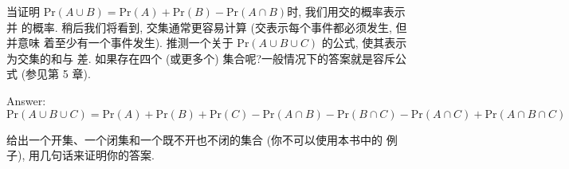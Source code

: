 \exer 当证明 $\mathrm{Pr}(A\cup B) = \mathrm{Pr}(A) + \mathrm{Pr}(B) - \mathrm{Pr}(A \cap B)$时, 我们用交的概率表示并
的概率. 稍后我们将看到, 交集通常更容易计算 (交表示每个事件都必须发生, 但并意味 着至少有一个事件发生). 推测一个关于 $\mathrm{Pr}(A\cup B\cup C)$ 的公式, 使其表示为交集的和与 差. 如果存在四个 (或更多个) 集合呢?一般情况下的答案就是容斥公式 (参见第 5 章).\par
Answer: $$\mathrm{Pr}(A\cup B\cup C) = \mathrm{Pr}(A) + \mathrm{Pr}(B)+ \mathrm{Pr}(C) - \mathrm{Pr}(A\cap B) -\mathrm{Pr}(B\cap C)-\mathrm{Pr}(A\cap C) + \mathrm{Pr}(A\cap B\cap C)$$

\exer 给出一个开集、一个闭集和一个既不开也不闭的集合 (你不可以使用本书中的 例子), 用几句话来证明你的答案.\par